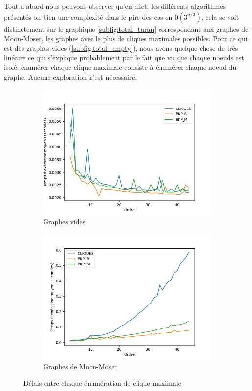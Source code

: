 \documentclass[12pt,a4paper]{article}
\begin{document}
Tout d'abord nous pouvons observer qu'en effet, les différents algorithmes présentés on bien une complexité dans le pire des cas en \(0(3^{n/3})\), cela se voit distinctement sur le graphique \ref{subfig:total_turan} correspondant aux graphes de Moon-Moser, les graphes avec le plus de cliques maximales possibles. Pour ce qui est des graphes vides (\ref{subfig:total_empty}), nous avons quelque chose de très linéaire ce qui s'explique probablement par le fait que vu que chaque noeuds est isolé, énumérer chaque clique maximale consiste à énumérer chaque noeud du graphe. Aucune exploration n'est nécessaire.

\begin{figure}[ht]
  \centering
  \begin{subfigure}[b]{0.42\textwidth}
    \includegraphics[width=\textwidth]{images/delay_pivot_empty_plot.png}
    \caption{Graphes vides}
    \label{subfig:delay_empty}
  \end{subfigure}
  \begin{subfigure}[b]{0.42\textwidth}
    \includegraphics[width=\textwidth]{images/delay_pivot_turan_plot.png}
    \caption{Graphes de Moon-Moser}
    \label{subfig:delay_turan}
  \end{subfigure}
  \caption{Délais entre chaque énumération de clique maximale}
  \label{fig:special_delay}
\end{figure}
\end{document}
